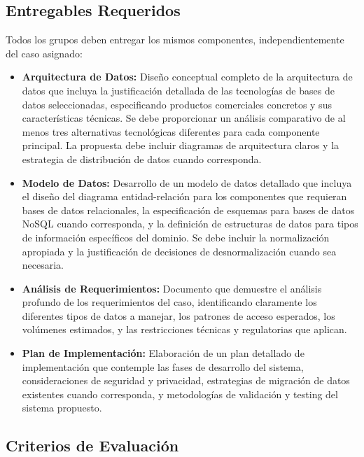\documentclass[12pt]{article}
\begin{document}
\subsection*{Entregables Requeridos}

Todos los grupos deben entregar los mismos componentes, independientemente del caso asignado:

\begin{itemize}
\item \textbf{Arquitectura de Datos:} Diseño conceptual completo de la arquitectura de datos que incluya la justificación detallada de las tecnologías de bases de datos seleccionadas, especificando productos comerciales concretos y sus características técnicas. Se debe proporcionar un análisis comparativo de al menos tres alternativas tecnológicas diferentes para cada componente principal. La propuesta debe incluir diagramas de arquitectura claros y la estrategia de distribución de datos cuando corresponda.

\item \textbf{Modelo de Datos:} Desarrollo de un modelo de datos detallado que incluya el diseño del diagrama entidad-relación para los componentes que requieran bases de datos relacionales, la especificación de esquemas para bases de datos NoSQL cuando corresponda, y la definición de estructuras de datos para tipos de información específicos del dominio. Se debe incluir la normalización apropiada y la justificación de decisiones de desnormalización cuando sea necesaria.

\item \textbf{Análisis de Requerimientos:} Documento que demuestre el análisis profundo de los requerimientos del caso, identificando claramente los diferentes tipos de datos a manejar, los patrones de acceso esperados, los volúmenes estimados, y las restricciones técnicas y regulatorias que aplican.

\item \textbf{Plan de Implementación:} Elaboración de un plan detallado de implementación que contemple las fases de desarrollo del sistema, consideraciones de seguridad y privacidad, estrategias de migración de datos existentes cuando corresponda, y metodologías de validación y testing del sistema propuesto.
\end{itemize}

\subsection*{Criterios de Evaluación}
\end{document}
